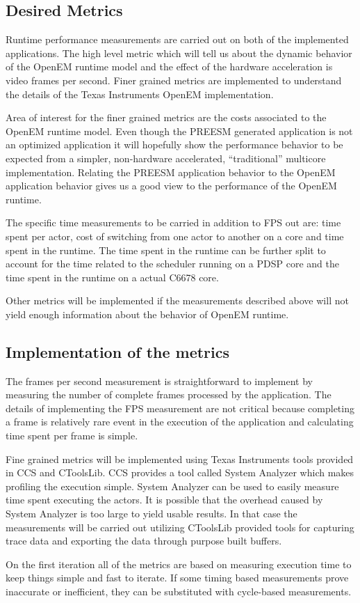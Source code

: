 \subsection{Desired Metrics}
Runtime performance measurements are carried out on both of the implemented applications. The high level metric which will tell us about the dynamic behavior of the OpenEM runtime model and the effect of the hardware acceleration is video frames per second. Finer grained metrics are implemented to understand the details of the Texas Instruments OpenEM implementation.

Area of interest for the finer grained metrics are the costs associated to the OpenEM runtime model. Even though the PREESM generated application is not an optimized application it will hopefully show the performance behavior to be expected from a simpler, non-hardware accelerated, ``traditional'' multicore implementation. Relating the PREESM application behavior to the OpenEM application behavior gives us a good view to the performance of the OpenEM runtime.

The specific time measurements to be carried in addition to FPS out are: time spent per actor, cost of switching from one actor to another on a core and time spent in the runtime. The time spent in the runtime can be further split to account for the time related to the scheduler running on a PDSP core and the time spent in the runtime on a actual C6678 core.

Other metrics will be implemented if the measurements described above will not yield enough information about the behavior of OpenEM runtime.
\subsection{Implementation of the metrics}
The frames per second measurement is straightforward to implement by measuring the number of complete frames processed by the application. The details of implementing the FPS measurement are not critical because completing a frame is relatively rare event in the execution of the application and calculating time spent per frame is simple.

Fine grained metrics will be implemented using Texas Instruments tools provided in CCS and CToolsLib. CCS provides a tool called System Analyzer which makes profiling the execution simple. System Analyzer can be used to easily measure time spent executing the actors. It is possible that the overhead caused by System Analyzer is too large to yield usable results. In that case the measurements will be carried out utilizing CToolsLib provided tools for capturing trace data and exporting the data through purpose built buffers.

On the first iteration all of the metrics are based on measuring execution time to keep things simple and fast to iterate. If some timing based measurements prove inaccurate or inefficient, they can be substituted with cycle-based measurements.
